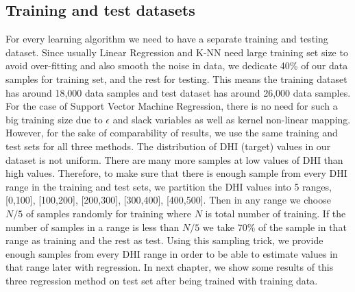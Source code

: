 \subsection{Training and test datasets}
For every learning algorithm we need to have a separate training and testing dataset. Since usually Linear Regression and K-NN need large training set size to avoid over-fitting and also smooth the noise in data, we dedicate 40\% of our data samples for training set, and the rest for testing. This means the training dataset has around 18,000 data samples and test dataset has around 26,000 data samples. For the case of Support Vector Machine Regression, there is no need for such a big training size due to $\epsilon$ and slack variables as well as kernel non-linear mapping. However, for the sake of comparability of results, we use the same training and test sets for all three methods. The distribution of DHI (target) values in our dataset is not uniform. There are many more samples at low values of DHI than high values. Therefore, to make sure that there is enough sample from every DHI range in the training and test sets, we partition the DHI values into 5 ranges, [0,100], [100,200], [200,300], [300,400], [400,500]. Then in any range we choose $N/5$ of samples randomly for training where $N$ is total number of training. If the number of samples in a range is less than $N/5$ we take 70\% of the sample in that range as training and the rest as test. Using this sampling trick, we provide enough samples from every DHI range in order to be able to estimate values in that range later with regression. In next chapter, we show some results of this three regression method on test set after being trained with training data.



